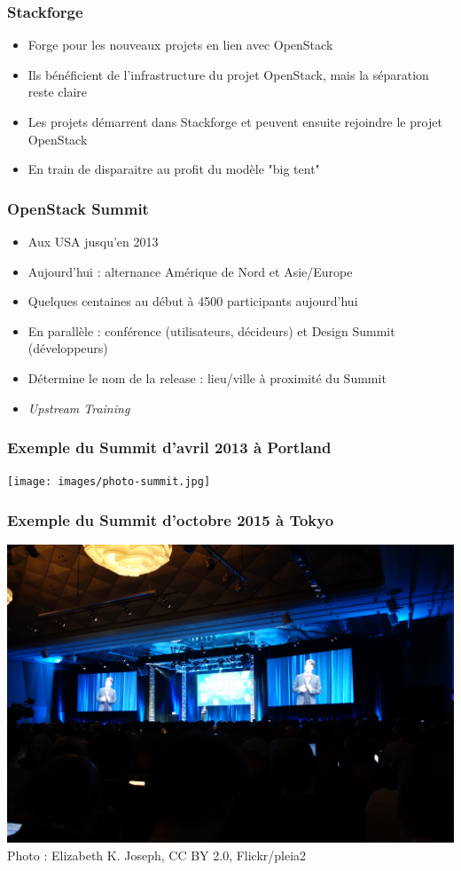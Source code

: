   \begin{frame}
    \frametitle{Stackforge}
    \begin{itemize}
      \item Forge pour les nouveaux projets en lien avec OpenStack
      \item Ils bénéficient de l'infrastructure du projet OpenStack, mais la séparation reste claire
      \item Les projets démarrent dans Stackforge et peuvent ensuite rejoindre le projet OpenStack
      \item En train de disparaitre au profit du modèle "big tent"
    \end{itemize}
  \end{frame}

  \begin{frame}
    \frametitle{OpenStack Summit}
    \begin{itemize}
      \item Aux USA jusqu'en 2013
      \item Aujourd'hui : alternance Amérique de Nord et Asie/Europe
      \item Quelques centaines au début à 4500 participants aujourd'hui
      \item En parallèle : conférence (utilisateurs, décideurs) et Design Summit (développeurs)
      \item Détermine le nom de la release : lieu/ville à proximité du Summit
      \item \textit{Upstream Training}
    \end{itemize}
  \end{frame}

  \begin{frame}
    \frametitle{Exemple du Summit d'avril 2013 à Portland}
    \texttt{[image: images/photo-summit.jpg]}
  \end{frame}

  \begin{frame}
    \frametitle{Exemple du Summit d'octobre 2015 à Tokyo}
    \includegraphics[width=\textwidth]{images/photo-summit1.jpg}
    Photo : Elizabeth K. Joseph, CC BY 2.0, Flickr/pleia2
  \end{frame}

